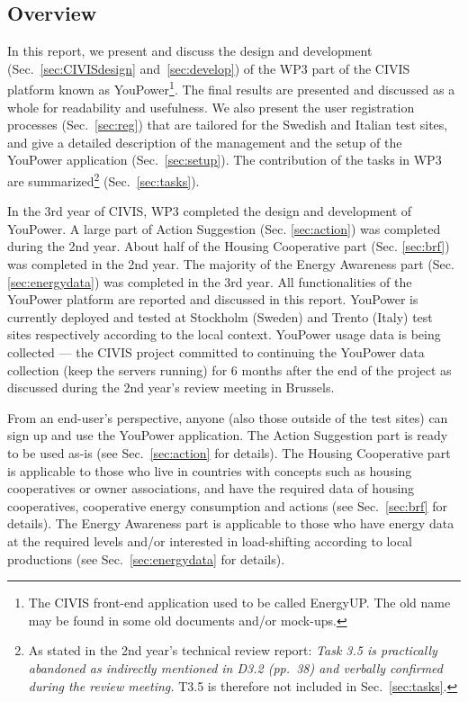 \subsection{Overview}

In this report, we present and discuss the design and development (Sec.~\ref{sec:CIVISdesign} and~\ref{sec:develop}) of the WP3 part of the CIVIS platform known as YouPower\footnote{The CIVIS front-end application used to be called EnergyUP. The old name may be found in some old documents and/or mock-ups.}. 
The final results are presented and discussed as a whole for readability and usefulness. 
% 
We also present the user registration processes (Sec.~\ref{sec:reg}) that are tailored for the Swedish and Italian test sites, and give a detailed description of the management and the setup of the YouPower application (Sec.~\ref{sec:setup}). The contribution of the tasks in WP3 are summarized\footnote{As stated in the 2nd year's technical review report: \textit{Task 3.5 is practically abandoned as indirectly mentioned in D3.2 (pp.~38) and verbally confirmed
during the review meeting.} T3.5 is therefore not included in Sec.~\ref{sec:tasks}.} (Sec.~\ref{sec:tasks}). 

In the 3rd year of CIVIS, WP3 completed the design and development of YouPower. A large part of Action Suggestion (Sec. \ref{sec:action}) was completed during the 2nd year. About half of the Housing Cooperative part (Sec. \ref{sec:brf}) was completed in the 2nd year. The majority of the Energy Awareness part (Sec. \ref{sec:energydata}) was completed in the 3rd year. 
All functionalities of the YouPower platform are reported and discussed in this report. YouPower is currently deployed and tested at Stockholm (Sweden) and Trento (Italy) test sites respectively according to the local context. YouPower usage data is being collected --- the CIVIS project committed to continuing the YouPower data collection (keep the servers running) for 6 months after the end of the project as discussed during the 2nd year's review meeting in Brussels. 

From an end-user's perspective, anyone (also those outside of the test sites) can sign up and use the YouPower application. 
The Action Suggestion part is ready to be used as-is (see Sec.~\ref{sec:action} for details). The Housing Cooperative part is applicable to those who live in countries with concepts such as housing cooperatives or owner associations, and have the required data of housing cooperatives, cooperative energy consumption and actions (see Sec.~\ref{sec:brf} for details). The Energy Awareness part is applicable to those who have energy data at the required levels and/or interested in load-shifting according to local productions (see Sec.~\ref{sec:energydata} for details). 

